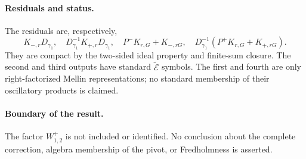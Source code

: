 \paragraph{Residuals and status.}
The residuals are, respectively,
\[
 K_{-,r}D_{\gamma_1},\quad
 D_{\gamma_1}^{-1}K_{+,r}D_{\gamma_1},\quad
 P^-K_{r,G}+K_{-,rG},\quad
 D_{\gamma_1}^{-1}(P^+K_{r,G}+K_{+,rG}).
\]
They are compact by the two-sided ideal property and finite-sum closure.
The second and third outputs have standard
\(\widetilde{\mathcal E}\) symbols. The first and fourth are only
right-factorized Mellin representations; no standard membership of their
oscillatory products is claimed.

\paragraph{Boundary of the result.}
The factor \(W_{1,2}^{+}\) is not included or identified. No conclusion about
the complete correction, algebra membership of the pivot, or Fredholmness is
asserted.
